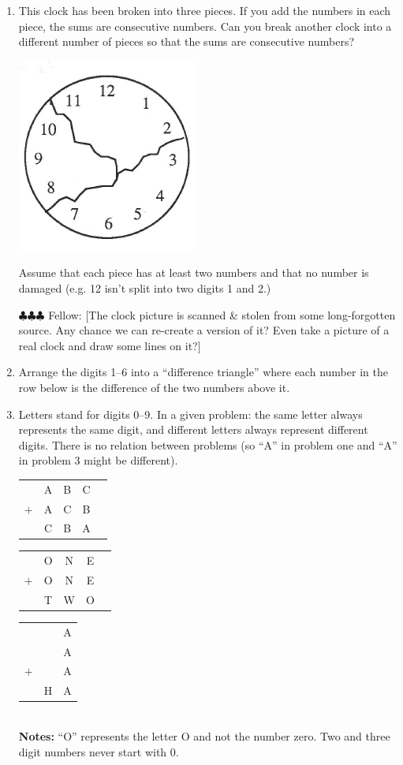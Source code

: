 \documentclass[10pt, reqno]{amsart}
\theoremstyle{remark}
\theoremstyle{definition}
\numberwithin{equation}{section}  %
\newcommand{\fellow}[1]{{\color{magenta} \sf $\clubsuit\clubsuit\clubsuit$ Fellow: [#1]}}
\begin{document}
\begin{enumerate}

\item
 This clock has been broken into three pieces.  If you add the numbers in each piece, the sums are consecutive numbers.  Can you break another clock into a different number of pieces so that the sums are consecutive numbers?  
\begin{center}
\includegraphics[height=3 cm]{clock}
\end{center}
Assume that each piece has at least two numbers and that no number is damaged (e.g. 12 isn't split into two digits 1 and 2.) 

\fellow{The clock picture is scanned \& stolen from some long-forgotten source.  Any chance we can re-create a version of it?  Even take a picture of a real clock and draw some lines on it?}



\item
Arrange the digits 1--6 into a ``difference triangle'' where each number in the row below is the difference of the two numbers above it.\\

\item
Letters stand for digits 0--9.  In a given problem: the same letter always represents the same digit, and different letters always represent different digits.  There is no relation between problems (so ``A'' in problem one and ``A'' in problem 3 might be different).

\begin{tabular}{c c c c c }
& A & B & C\\
$+$& A & C & B\\\hline
& C & B & A\\
\end{tabular}
\qquad
\begin{tabular}{c c c c c }
& O & N & E\\
$+$& O & N & E\\\hline
& T & W & O\\
\end{tabular}
\qquad
\begin{tabular}{c c c }
&& A \\
&& A \\
$+$&& A \\\hline
&H& A \\
\end{tabular}\\
{\bf Notes:} ``O'' represents the letter O and not the number zero.  Two and three digit numbers never start with 0.  



\end{enumerate}
\end{document}
